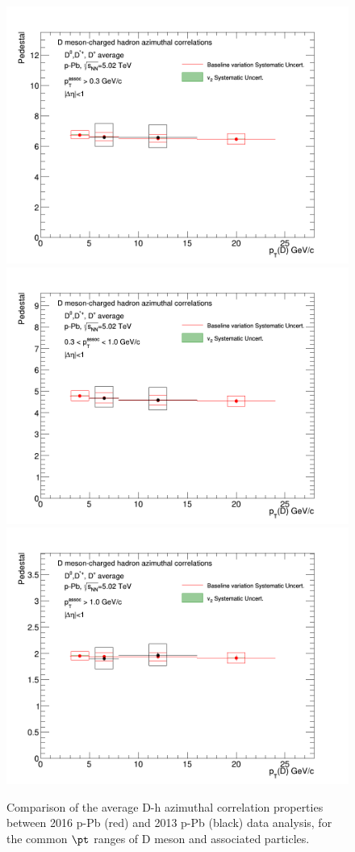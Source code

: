 \begin{figure}[!htbp]
{\includegraphics[width=0.31\linewidth]{figures/Cfr2013vs2016/Pedestal_Cfr_2013_2016_Thr03to99.png}}
{\includegraphics[width=0.31\linewidth]{figures/Cfr2013vs2016/Pedestal_Cfr_2013_2016_Thr03to1.png}}
{\includegraphics[width=0.31\linewidth]{figures/Cfr2013vs2016/Pedestal_Cfr_2013_2016_Thr1to99.png}}
\caption{Comparison of the average D-h azimuthal correlation properties between 2016 p-Pb (red) and 2013 p-Pb (black) data analysis, for the common $\pt$ ranges of D meson and associated particles.}
\label{fig:CfrObs}
\end{figure}
